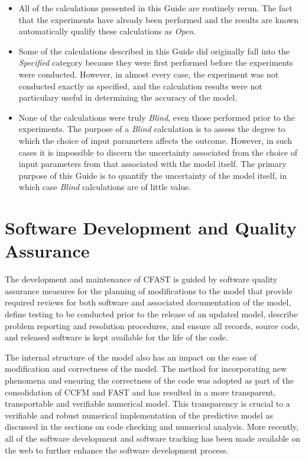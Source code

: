 \begin{itemize}
\item All of the calculations presented in this Guide are routinely rerun. The
fact that the experiments have already been performed and the results are known automatically qualify these
calculations as {\em Open}.
\item Some of the calculations described in this Guide did originally fall into the {\em Specified} category because they
were first performed before the experiments were conducted. However, in almost every case, the experiment was not conducted
exactly as specified, and the calculation results were not particulary useful in determining the accuracy of the model.
\item None of the calculations were truly {\em Blind}, even those performed prior to the experiments. The purpose of a
{\em Blind} calculation is to assess the degree to which the choice of input parameters affects the outcome. However,
in such cases it is impossible to discern the uncertainty associated from the choice of input parameters from that associated
with the model itself. The primary purpose of this Guide is to quantify the uncertainty of the model itself, in which
case {\em Blind} calculations are of little value.
\end{itemize}


\section{Software Development and Quality Assurance}

The development and maintenance of CFAST is guided by software quality assurance measures for the planning of modifications to the model that provide required reviews for both software and associated documentation of the model, define testing to be conducted prior to the release of an updated model, describe problem reporting and resolution procedures, and ensure all records, source code, and released software is kept available for the life of the code.

The internal structure of the model also has an impact on the ease of modification and correctness of the model.  The method for incorporating new phenomena and ensuring the correctness of the code was adopted as part of the consolidation of CCFM and FAST and has resulted in a more transparent, transportable and verifiable numerical model. This transparency is crucial to a verifiable and robust numerical implementation of the predictive model as discussed in the sections on code checking and numerical analysis.  More recently, all of the software development and software tracking has been made available on the web to further enhance the software development process.

